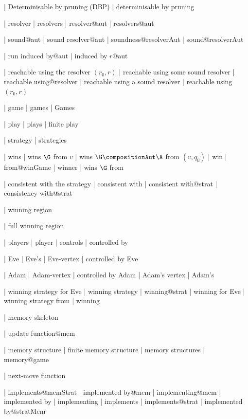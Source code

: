   
  | Determinisable by pruning (DBP)
  | determinisable by pruning


| resolver
| resolvers
| resolver@aut
| resolvers@aut

| sound@aut
| sound resolver@aut
| soundness@resolverAut
| sound@resolverAut


| run induced by@aut
| induced by $r$@aut


  | reachable using the resolver $(r_0, r)$
  | reachable using some sound resolver
  | reachable using@resolver
  | reachable using a sound resolver
  | reachable using $(r_0, r)$



  | game
  | games
  | Games

  | play
  | plays
  | finite play

  | strategy
  | strategies

  | wins
  | wins $\G $ from $v$
  | wins $\G \compositionAut \A $ from $(v, q_0)$
  | win
  | from@winGame
  | winner
  | wins $\G $ from

  | consistent with the strategy
  | consistent with
  | consistent with@strat
  | consistency with@strat
  
  | winning region

| full winning region

  | players
  | player
  | controls
  | controlled by
  

  | Eve
  | Eve's
  | Eve-vertex
  | controlled by Eve

  | Adam
  | Adam-vertex
  | controlled by Adam
  | Adam's vertex
  | Adam's

  | winning strategy for Eve
  | winning strategy
  | winning@strat
  | winning for Eve
  | winning strategy from
  | winning

  | memory skeleton

  | update function@mem

  | memory structure
  | finite memory structure
  | memory structures
   | memory@game

  | next-move function

  | implements@memStrat
  | implemented by@mem
  | implementing@mem
  | implemented by
  | implementing
  | implements
  | implements@strat
  | implemented by@stratMem

